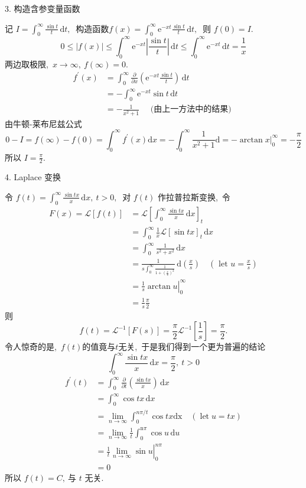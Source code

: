\begin{solution}
		3. 构造含参变量函数
		
		记 $ I=\int_{0}^{\infty} \frac{\sin t}{t}\,\mathrm{d}t ,\ $ 构造函数$  f(x)=\int_{0}^{\infty} \mathrm{e}^{-xt} \frac{\sin t}{t} \,\mathrm{d}t ,\ $ 则 $ f(0)=I.$
		$$0 \leq|f(x)| \leq \int_{0}^{\infty} \mathrm{e}^{-xt}\left|\frac{\sin t}{t}\right|\,\mathrm{d}t\leq \int_{0}^{\infty} \mathrm{e}^{-xt} \,\mathrm{d}t=\frac{1}{x}$$
		两边取极限,\   $x\rightarrow \infty,\ f(\infty)=0 .$
		$$\begin{aligned}
			f^{\prime}(x) & =\int_{0}^{\infty} \frac{\partial}{\partial x}\left(\mathrm{e}^{-xt} \frac{\sin t}{t}\right)\,\mathrm{d}t \\
			& =-\int_{0}^{\infty} \mathrm{e}^{-xt} \sin t \,\mathrm{d}t \\
			& =-\frac{1}{x^{2}+1} \quad \text { (由上一方法中的结果) }
		\end{aligned}$$
		由牛顿-莱布尼兹公式
		$$0-I=f(\infty)-f(0)=\int_{0}^{\infty}f^{\prime}(x) \mathrm{d}x=-\int_{0}^{\infty} \frac{1}{x^{2}+1} \mathrm{d}=-\left.\arctan x\right|_{0} ^{\infty}=-\frac{\pi}{2}$$
		所以 $ I=\frac{\pi}{2} .$
		
		4. Laplace 变换
		
		令 $ f(t)=\int_{0}^{\infty} \frac{\sin tx}{x}\,\mathrm{d}x,\  t>0 ,\ $ 对 $ f(t)$  作拉普拉斯变换,\  令
		$$\begin{aligned}
			F(x)=\mathscr{L}[f(t)] & =\mathscr{L}\left[\int_{0}^{\infty} \frac{\sin tx}{x} \,\mathrm{d}x\right]_{t} \\
			& =\int_{0}^{\infty} \frac{1}{x} \mathscr{L}[\sin tx]_{t} \,\mathrm{d}x \\
			& =\int_{0}^{\infty} \frac{1}{s^{2}+x^{2}}\,\mathrm{d}x \\
			& =\frac{1}{s \int_{0}^{\infty} \frac{1}{1+\left(\frac{x}{s}\right)^{2}}} \,\mathrm{d}\left(\frac{x}{s}\right) \quad\left(\text { let } u=\frac{x}{s}\right) \\
			& =\left.\frac{1}{s} \arctan u\right|_{0} ^{\infty} \\
			& =\frac{1}{s} \frac{\pi}{2}
		\end{aligned}$$
		则  $$f(t)=\mathscr{L}^{-1}[F(s)]=\frac{\pi}{2} \mathscr{L}^{-1}\left[\frac{1}{s}\right]=\frac{\pi}{2} .$$
		令人惊奇的是,\  $ f(t)  $的值竟与$  t  $无关,\  于是我们得到一个更为普遍的结论
		$$\int_{0}^{\infty} \frac{\sin tx}{x} \,\mathrm{d}x=\frac{\pi}{2},\  t>0$$
		$$\begin{aligned}
			f^{\prime}(t) & =\int_{0}^{\infty} \frac{\partial}{\partial t}\left(\frac{\sin tx}{x}\right)\,\mathrm{d}x\\
			& =\int_{0}^{\infty} \cos tx\,\mathrm{d}x \\
			& =\lim\limits_{n\rightarrow \infty} \int_{0}^{n\pi / t} \cos tx \mathrm{dx} \quad(\operatorname{let} u=tx) \\
			& =\lim\limits_{n \rightarrow \infty} \frac{1}{t} \int_{0}^{\mathrm{n} \pi} \cos u\,\mathrm{d}u \\
			& =\left.\frac{1}{t} \lim\limits_{n\rightarrow \infty} \sin u\right|_{0} ^{n\pi} \\
			& =0
		\end{aligned}$$
		所以  $f(t)=C ,\  $与 $ t $ 无关.
		

\end{solution}
